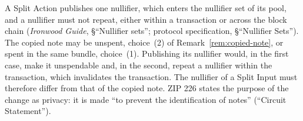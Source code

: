 \documentclass[11pt,a4paper]{article}
\theoremstyle{definition}
\begin{document}
A Split Action publishes one nullifier, which enters the nullifier set of
its pool, and a nullifier must not repeat, either within a transaction or
across the block chain (\emph{Ironwood Guide}, \S``Nullifier sets'';
protocol specification, \S``Nullifier Sets''). The copied note may be
unspent, choice~(2) of Remark~\ref{rem:copied-note}, or spent in the same
bundle, choice~(1). Publishing its nullifier would, in the first case, make
it unspendable and, in the second, repeat a nullifier within the
transaction, which invalidates the transaction. The nullifier of a Split
Input must therefore differ from that of the copied note. ZIP 226 states the
purpose of the change as privacy: it is made ``to prevent the
identification of notes'' (``Circuit Statement'').

\end{document}
